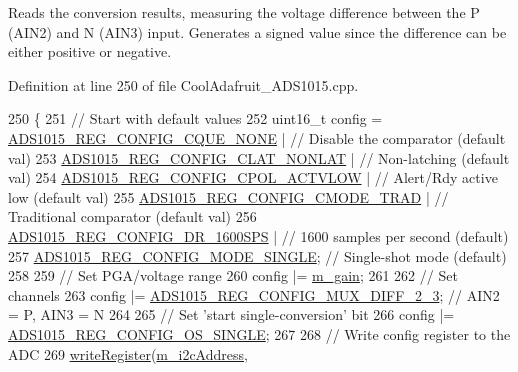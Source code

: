 Reads the conversion results, measuring the voltage difference between the P (A\+I\+N2) and N (A\+I\+N3) input. Generates a signed value since the difference can be either positive or negative. 



Definition at line 250 of file Cool\+Adafruit\+\_\+\+A\+D\+S1015.\+cpp.


\begin{DoxyCode}
250                                                    \{
251   \textcolor{comment}{// Start with default values}
252   uint16\_t config = \hyperlink{_cool_adafruit___a_d_s1015_8h_aa52ede69f39daf837bb2ebbe639dbef9}{ADS1015\_REG\_CONFIG\_CQUE\_NONE}    | \textcolor{comment}{// Disable the comparator
       (default val)}
253                     \hyperlink{_cool_adafruit___a_d_s1015_8h_a98757804761f1d945f4cf6ca40e30457}{ADS1015\_REG\_CONFIG\_CLAT\_NONLAT}  | \textcolor{comment}{// Non-latching
       (default val)}
254                     \hyperlink{_cool_adafruit___a_d_s1015_8h_a775f732c7e97574b38858820b96cf771}{ADS1015\_REG\_CONFIG\_CPOL\_ACTVLOW} | \textcolor{comment}{// Alert/Rdy active
       low   (default val)}
255                     \hyperlink{_cool_adafruit___a_d_s1015_8h_afb5240325d7ec757ccad7b098a2b93c3}{ADS1015\_REG\_CONFIG\_CMODE\_TRAD}   | \textcolor{comment}{// Traditional
       comparator (default val)}
256                     \hyperlink{_cool_adafruit___a_d_s1015_8h_aa4665026711a8587430d9235dbc4ccf0}{ADS1015\_REG\_CONFIG\_DR\_1600SPS}   | \textcolor{comment}{// 1600 samples per
       second (default)}
257                     \hyperlink{_cool_adafruit___a_d_s1015_8h_a50168c1821f075b7296745be1d4d346f}{ADS1015\_REG\_CONFIG\_MODE\_SINGLE};   \textcolor{comment}{// Single-shot mode
       (default)}
258 
259   \textcolor{comment}{// Set PGA/voltage range}
260   config |= \hyperlink{class_adafruit___a_d_s1015_a8db90fe03d55a18246984ba2ba5e7f32}{m\_gain};
261 
262   \textcolor{comment}{// Set channels}
263   config |= \hyperlink{_cool_adafruit___a_d_s1015_8h_a438ac41e1655d0c8e10a62b36d803696}{ADS1015\_REG\_CONFIG\_MUX\_DIFF\_2\_3};          \textcolor{comment}{// AIN2 = P, AIN3 = N}
264 
265   \textcolor{comment}{// Set 'start single-conversion' bit}
266   config |= \hyperlink{_cool_adafruit___a_d_s1015_8h_a13f4550d061699b1cf4bd49520fc4a9c}{ADS1015\_REG\_CONFIG\_OS\_SINGLE};
267 
268   \textcolor{comment}{// Write config register to the ADC}
269   \hyperlink{_cool_adafruit___a_d_s1015_8cpp_a00ef55774dfb93dd0a7bf561d8451b71}{writeRegister}(\hyperlink{class_adafruit___a_d_s1015_a2186993621a7973256d47f086c74035d}{m\_i2cAddress}, 

\end{DoxyCode}
